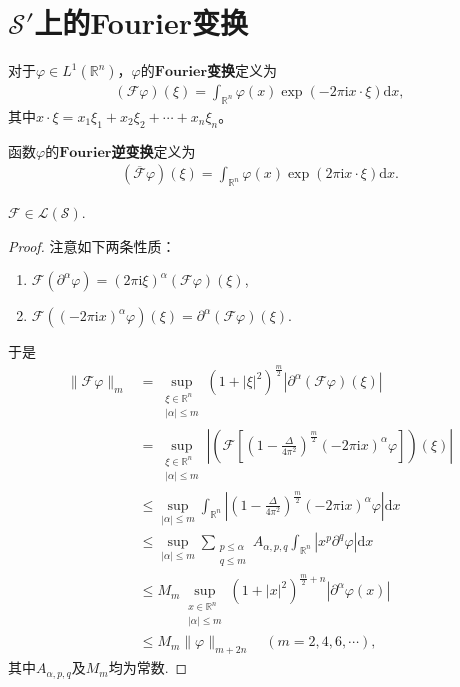 \documentclass[../../main.tex]{subfiles}%
\begin{document}
\section{$\mathscr{S}'$上的Fourier变换}

\begin{definition}
对于$\varphi\in L^1(\mathbb{R}^n)$，$\varphi$的$\mathbf{Fourier}$\textbf{变换}定义为
\begin{align*}
(\mathscr{F}\varphi)(\xi)=\int_{\mathbb{R}^n}\varphi(x)\exp(-2\pi\mathrm{i}x\cdot\xi)\mathrm{d}x,
\end{align*}
其中$x\cdot\xi=x_1\xi_1+x_2\xi_2+\cdots+x_n\xi_n$。

函数$\varphi$的$\mathbf{Fourier}$\textbf{逆变换}定义为
\begin{align*}
(\overline{\mathscr{F}}\varphi)(\xi)=\int_{\mathbb{R}^n}\varphi(x)\exp(2\pi\mathrm{i}x\cdot\xi)\mathrm{d}x.
\end{align*}
\end{definition}

\begin{proposition}
$\mathscr{F}\in\mathscr{L}(\mathscr{S})$.
\end{proposition}
\begin{proof}
注意如下两条性质：
\begin{enumerate}[(1)]
\item $\mathscr{F}(\partial^\alpha\varphi)=(2\pi\mathrm{i}\xi)^\alpha(\mathscr{F}\varphi)(\xi)$,
\item $\mathscr{F}((-2\pi\mathrm{i}x)^\alpha\varphi)(\xi)=\partial^\alpha(\mathscr{F}\varphi)(\xi)$.
\end{enumerate}
于是
\begin{align*}
\|\mathscr{F}\varphi\|_m&=\sup_{\substack{\xi\in\mathbb{R}^n\\|\alpha|\leqslant m}}(1+|\xi|^2)^{\frac{m}{2}}|\partial^\alpha(\mathscr{F}\varphi)(\xi)|\\
&=\sup_{\substack{\xi\in\mathbb{R}^n\\|\alpha|\leqslant m}}\left|\left(\mathscr{F}\left[\left(1-\frac{\Delta}{4\pi^2}\right)^{\frac{m}{2}}(-2\pi\mathrm{i}x)^\alpha\varphi\right]\right)(\xi)\right|\\
&\leqslant\sup_{|\alpha|\leqslant m}\int_{\mathbb{R}^n}\left|\left(1-\frac{\Delta}{4\pi^2}\right)^{\frac{m}{2}}(-2\pi\mathrm{i}x)^\alpha\varphi\right|\mathrm{d}x\\
&\leqslant\sup_{|\alpha|\leqslant m}\sum\limits_{\substack{p\leqslant\alpha\\q\leqslant m}}A_{\alpha,p,q}\int_{\mathbb{R}^n}|x^p\partial^q\varphi|\mathrm{d}x\\
&\leqslant M_m\sup_{\substack{x\in\mathbb{R}^n\\|\alpha|\leqslant m}}(1+|x|^2)^{\frac{m}{2}+n}|\partial^\alpha\varphi(x)|\\
&\leqslant M_m\|\varphi\|_{m+2n}\quad(m=2,4,6,\cdots),
\end{align*}
其中$A_{\alpha,p,q}$及$M_m$均为常数.
\end{proof}
\end{document}

